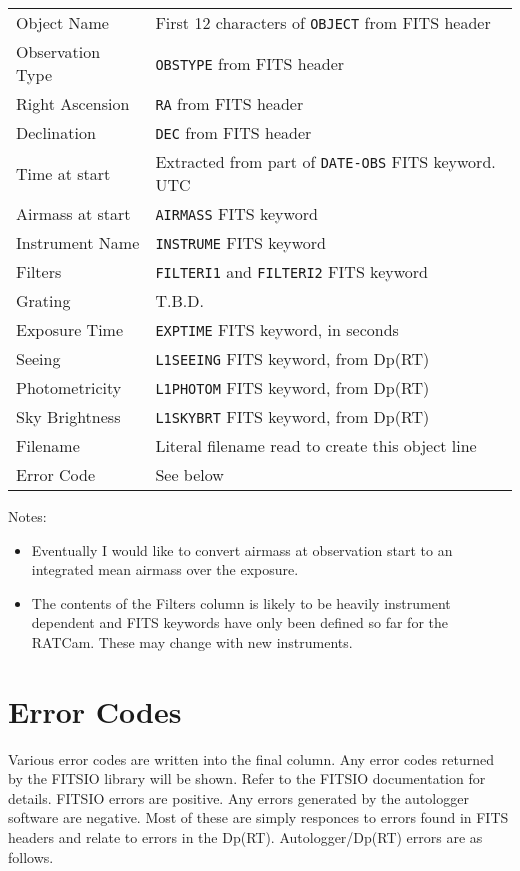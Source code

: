 \documentclass[10pt,a4paper]{article}
\begin{document}
\begin{tabular}{ll}
Object Name	& First 12 characters of {\tt OBJECT} from FITS header \\
Observation Type& {\tt OBSTYPE} from FITS header \\
Right Ascension & {\tt RA} from FITS header \\
Declination	& {\tt DEC} from FITS header \\
Time at start	& Extracted from part of {\tt DATE-OBS} FITS keyword. UTC \\
Airmass at start& {\tt AIRMASS} FITS keyword \\
Instrument Name & {\tt INSTRUME} FITS keyword \\
Filters		& {\tt FILTERI1} and {\tt FILTERI2} FITS keyword \\
Grating		& T.B.D.\\
Exposure Time	& {\tt EXPTIME} FITS keyword, in seconds\\
Seeing		& {\tt L1SEEING} FITS keyword, from Dp(RT)\\
Photometricity	& {\tt L1PHOTOM} FITS keyword, from Dp(RT)\\
Sky Brightness	& {\tt L1SKYBRT} FITS keyword, from Dp(RT)\\
Filename	& Literal filename read to create this object line\\
Error Code	& See below \\
\end{tabular}


Notes:
\begin{itemize}
\item Eventually I would like to convert airmass at observation start to 
an integrated mean airmass over the exposure.
\item The contents of the Filters column is likely to be heavily
instrument dependent and FITS keywords have only been defined so far for
the RATCam. These may change with new instruments.
\end{itemize}

\section{Error Codes}
Various error codes are written into the final column. Any error
codes returned by the FITSIO library will be shown. Refer to the 
FITSIO documentation for details. FITSIO errors are positive. Any
errors generated by the autologger software are negative. Most 
of these are simply responces to errors found in FITS headers 
and relate to errors in the Dp(RT). Autologger/Dp(RT) errors
are as follows.
\end{document}
